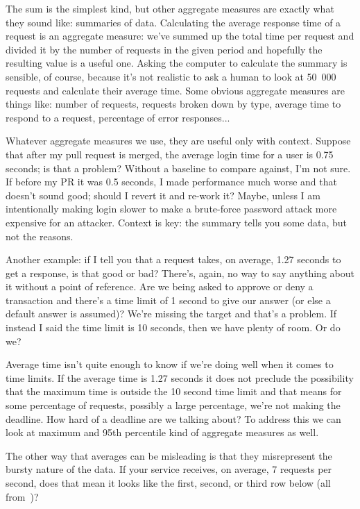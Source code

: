 \documentclass[a4paper]{report}
\begin{document}
The sum is the simplest kind, but other aggregate measures are exactly what they sound like: summaries of data. Calculating the average response time of a request is an aggregate measure: we've summed up the total time per request and divided it by the number of requests in the given period and hopefully the resulting value is a useful one. Asking the computer to calculate the summary is sensible, of course, because it's not realistic to ask a human to look at 50~000 requests and calculate their average time. Some obvious aggregate measures are things like: number of requests, requests broken down by type, average time to respond to a request, percentage of error responses...  

Whatever aggregate measures we use, they are useful only with context.  Suppose that after my pull request is merged, the average login time for a user is 0.75 seconds; is that a problem? Without a baseline to compare against, I'm not sure. If before my PR it was 0.5 seconds, I made performance much worse and that doesn't sound good; should I revert it and re-work it? Maybe, unless I am intentionally making login slower to make a brute-force password attack more expensive for an attacker. Context is key: the summary tells you some data, but not the reasons.

Another example: if I tell you that a request takes, on average, 1.27 seconds to get a response, is that good or bad? There's, again, no way to say anything about it without a point of reference. Are we being asked to approve or deny a transaction and there's a time limit of 1 second to give our answer (or else a default answer is assumed)? We're missing the target and that's a problem. If instead I said the time limit is 10 seconds, then we have plenty of room. Or do we?

Average time isn't quite enough to know if we're doing well when it comes to time limits. If the average time is 1.27 seconds it does not preclude the possibility that the maximum time is outside the 10 second time limit and that means for some percentage of requests, possibly a large percentage, we're not making the deadline. How hard of a deadline are we talking about? To address this we can look at maximum and 95th percentile kind of aggregate measures as well.

The other way that averages can be misleading is that they misrepresent the bursty nature of the data. If your service receives, on average, 7 requests per second, does that mean it looks like the first, second, or third row below (all from~\cite{usd})?
\end{document}
